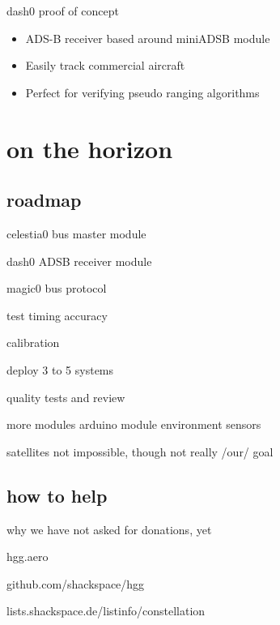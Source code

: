 	\begin{frame}{dash0 proof of concept}
		\begin{itemize}
			\item ADS-B receiver based around miniADSB module
			\item Easily track commercial aircraft
			\item Perfect for verifying pseudo ranging algorithms
		\end{itemize}
	\end{frame}

\section{on the horizon}	

\subsection{roadmap}
	\begin{frame}{celestia0 bus master module}
	\end{frame}
	\begin{frame}{dash0 ADSB receiver module}
	\end{frame}
	\begin{frame}{magic0 bus protocol}
	\end{frame}
	\begin{frame}{test timing accuracy}
	\end{frame}
	\begin{frame}{calibration}
	\end{frame}
	\begin{frame}{deploy 3 to 5 systems}
	\end{frame}
	\begin{frame}{quality tests and review}
	\end{frame}
	\begin{frame}{more modules}
		arduino module
		environment sensors
	\end{frame}
	\begin{frame}{satellites}
		not impossible, though not really /our/ goal
	\end{frame}

\subsection{how to help}
	\begin{frame}{why we have not asked for donations, yet}
	\end{frame}
	\begin{frame}{hgg.aero}
	\end{frame}
	\begin{frame}{github.com/shackspace/hgg}
	\end{frame}
	\begin{frame}{lists.shackspace.de/listinfo/constellation}
	\end{frame}



